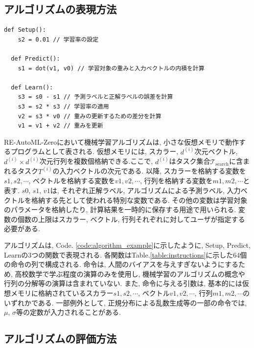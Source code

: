 \documentclass[11pt,oneside,openany,report]{jsbook}
\begin{document}
\subsection{アルゴリズムの表現方法}\label{subsec:problem:existing_method:algorithm_exp}

\begin{lstlisting}[caption=線型回帰アルゴリズムをAutoML-Zeroの表現方法で表した例,label=code:algorithm_example]
  def Setup():
    s2 = 0.01 // 学習率の設定

  def Predict():
    s1 = dot(v1, v0) // 学習対象の重みと入力ベクトルの内積を計算

  def Learn():
    s3 = s0 - s1 // 予測ラベルと正解ラベルの誤差を計算
    s3 = s2 * s3 // 学習率の適用
    v2 = s3 * v0 // 重みの更新するための差分を計算
    v1 = v1 + v2 // 重みを更新
\end{lstlisting}


RE-AutoML-Zeroにおいて機械学習アルゴリズムは, 小さな仮想メモリで動作するプログラムとして表される. 仮想メモリには, スカラー, $d^{(i)}$次元ベクトル, $d^{(i)} \times d^{(i)}$次元行列を複数個格納できる.ここで, $d^{(i)} $はタスク集合$\mathcal{T}_\mathrm{search}$に含まれるタスク$T^{(i)}$の入力ベクトルの次元である. 以降, スカラーを格納する変数を$s1,s2,\cdots$, ベクトルを格納する変数を$v1,v2,\cdots$, 行列を格納する変数を$m1,m2,\cdots$と表す. $s0$, $s1$, $v1$は, それぞれ正解ラベル, アルゴリズムによる予測ラベル, 入力ベクトルを格納する先として使われる特別な変数である. その他の変数は学習対象のパラメータを格納したり, 計算結果を一時的に保存する用途で用いられる. 変数の個数の上限はスカラー, ベクトル, 行列それぞれに対してユーザが指定する必要がある.

アルゴリズムは, Code. \ref{code:algorithm_example}に示したように, Setup, Predict, Learnの3つの関数で表現される. 各関数はTable.\ref{table:instructions}に示した64個の命令の列で構成される. 命令は, 人間のバイアスを与えすぎないようにするため, 高校数学で学ぶ程度の演算のみを使用し, 機械学習のアルゴリズムの概念や行列の分解等の演算は含まれていない. また, 命令に与える引数は, 基本的には仮想メモリに格納されているスカラー$s1,s2,\cdots$, ベクトル$v1,v2,\cdots$, 行列$m1,m2,\cdots$のいずれかである. 一部例外として, 正規分布による乱数生成等の一部の命令では, $\mu$, $\sigma$等の定数が入力されることがある.

\subsection{アルゴリズムの評価方法}\label{subsec:problem:existing_method:algorithm_eval}
\end{document}
